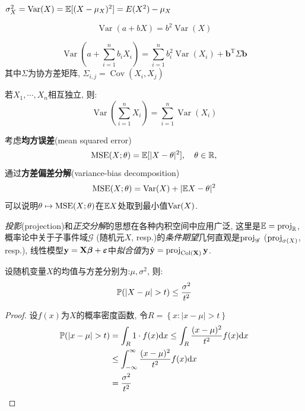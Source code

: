 \begin{theorem}
    $\sigma^2_X=\operatorname{Var}(X)=\E[(X-\mu_X)^2]=E(X^2)-\mu_X$
\end{theorem}

\begin{theorem}
    \[ \operatorname{Var}(a+bX)=b^2\operatorname{Var}(X) \]
\end{theorem}

\begin{theorem}
    \[ \operatorname{Var}(a+\sum_{i=1}^n b_i X_i)=\sum_{i=1}^n b_i^2 \operatorname{Var}(X_i)+\mathbf{b}^{\mathrm{T}} \Sigma \mathbf{b}\]
    其中$\Sigma$为协方差矩阵, $\Sigma_{i,j}=\operatorname{Cov}(X_i,X_j)$
\end{theorem}

\begin{theorem}
    若$X_1,\cdots ,X_n$相互独立, 则:
    \[ \operatorname{Var}(\sum_{i=1}^n X_i)=\sum_{i=1}^n\operatorname{Var}( X_i) \]
\end{theorem}

考虑\textbf{均方误差}(mean squared error)
\[ \MSE(X;\theta) = \E[|X-\theta|^{2}], \quad \theta\in\R, \]
通过\textbf{方差偏差分解}(variance-bias decomposition)
\[ \MSE(X;\theta) = \Var(X) + |\E{X}-\theta|^{2} \]
可以说明$\theta\mapsto\MSE(X;\theta)$在$\E{X}$处取到最小值$\Var(X)$.

\emph{投影}(projection)和\emph{正交分解}的思想在各种内积空间中应用广泛, 这里是$\E = \proj{}{\R}$, 概率论中关于子事件域$\mathscr{G}$ (随机元$X$, resp.)的\emph{条件期望}几何直观是$\proj{}{\mathscr{G}}$ ($\proj{}{\sigma(X)}$, resp.), 线性模型$\mathbf{y} = \mathbf{X}\bm{\beta} + \bm{\e}$中\emph{拟合值}为$\hat{\mathbf{y}} = \proj{\mathbf{y}}{\operatorname{Col}(\mathbf{X})}$.

\begin{theorem}[Chebyshev不等式]
    设随机变量$X$的均值与方差分别为:$\mu, \sigma^2$, 则:
    \[ \P(\left| X-\mu \right| >t)\le \frac{\sigma^{2}}{t^{2}} \]
\end{theorem}

\begin{proof}
    设$f(x)$为$X$的概率密度函数, 令$R=\left\{ x:|x-\mu|>t \right\} $
    \begin{align*}
        \P(|x-\mu|>t) &= \int_R 1 \cdot  f(x)\d x \le \int_R \frac{(x-\mu)^2}{t^{2}}f(x) \d x \\
        & \le \int_{-\infty}^{\infty}\frac{(x-\mu)^2}{t^{2}}f(x) \d x\\
        & = \frac{\sigma^{2}}{t^{2}}
    \end{align*}
\end{proof}


